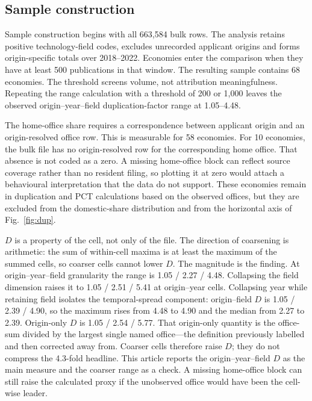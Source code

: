 \documentclass[a4paper,fleqn]{cas-dc}
\begin{document}
\subsection{Sample construction}\label{sec:sample}

Sample construction begins with all 663,584 bulk rows. The analysis retains
positive technology-field codes, excludes unrecorded applicant origins and
forms origin-specific totals over 2018--2022. Economies enter the comparison
when they have at least 500 publications in that window. The resulting sample
contains 68 economies. The threshold screens volume, not attribution
meaningfulness. Repeating the range calculation with a threshold of 200 or
1,000 leaves the observed origin--year--field duplication-factor range at
1.05--4.48.

The home-office share requires a correspondence between applicant origin and
an origin-resolved office row. This is measurable for 58 economies. For 10
economies, the bulk file has no origin-resolved row for the corresponding home
office. That absence is not coded as a zero. A missing home-office block can
reflect source coverage rather than no resident filing, so plotting it at zero
would attach a behavioural interpretation that the data do not support. These
economies remain in duplication and PCT calculations based on the observed
offices, but they are excluded from the domestic-share distribution and from
the horizontal axis of Fig.~\ref{fig:dup}.

$D$ is a property of the cell, not only of the file. The direction of
coarsening is arithmetic: the sum of within-cell maxima is at least the
maximum of the summed cells, so coarser cells cannot lower $D$. The magnitude
is the finding. At origin--year--field granularity the range is 1.05 / 2.27 /
4.48. Collapsing the field dimension raises it to 1.05 / 2.51 / 5.41 at
origin--year cells. Collapsing year while retaining field isolates the
temporal-spread component: origin--field $D$ is 1.05 / 2.39 / 4.90, so the
maximum rises from 4.48 to 4.90 and the median from 2.27 to 2.39. Origin-only
$D$ is 1.05 / 2.54 / 5.77. That origin-only quantity is the office-sum
divided by the largest single named office---the definition previously
labelled and then corrected away from. Coarser cells therefore raise $D$; they
do not compress the 4.3-fold headline. This article reports the
origin--year--field $D$ as the main measure and the coarser range as a check.
A missing home-office block can still raise the calculated proxy if the
unobserved office would have been the cell-wise leader.
\end{document}
